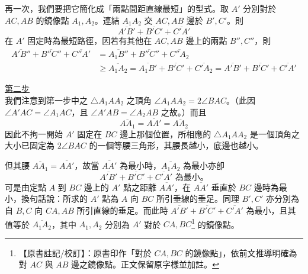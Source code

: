 再一次，我們要把它簡化成「兩點間距直線最短」的型式。取 $A'$ 分別對於 $AC, AB$ 的鏡像點 $A_1, A_2$。連結 $A_1A_2$ 交 $AC, AB$ 邊於 $B', C'$。則
\[ \overline{A'B'} + \overline{B'C'} + \overline{C'A'} \]
在 $A'$ 固定時為最短路徑，因若有其他在 $AC, AB$ 邊上的兩點 $B'', C''$，則
\begin{align*}
\overline{A'B''} + \overline{B''C''} + \overline{C''A'} &= \overline{A_1B''} + \overline{B''C''} + \overline{C''A_2} \\
&\ge \overline{A_1A_2} = \overline{A_1B'} + \overline{B'C'} + \overline{C'A_2} = \overline{A'B'} + \overline{B'C'} + \overline{C'A'}
\end{align*}

\noindent\underline{第二步} \\
我們注意到第一步中之 $\triangle A_1AA_2$ 之頂角 $\angle A_1AA_2 = 2\angle BAC$。（此因 $\angle A'AC = \angle A_1AC$，且 $\angle A'AB = \angle A_2AB$ 之故。）而且
\[ \overline{AA_1} = \overline{AA'} = \overline{AA_2} \]
因此不拘一開始 $A'$ 固定在 $BC$ 邊上那個位置，所相應的 $\triangle A_1AA_2$ 是一個頂角之大小已固定為 $2\angle BAC$ 的一個等腰三角形，其腰長越小，底邊也越小。

但其腰 $\overline{AA_1} = \overline{AA'}$，故當 $\overline{AA'}$ 為最小時，$\overline{A_1A_2}$ 為最小亦卽
\[ \overline{A'B'} + \overline{B'C'} + \overline{C'A'} \text{ 為最小。} \]
可是由定點 $A$ 到 $BC$ 邊上的 $A'$ 點之距離 $\overline{AA'}$，在 $\overline{AA'}$ 垂直於 $BC$ 邊時為最小，換句話說：所求的 $A'$ 點為 $A$ 向 $BC$ 所引垂線的垂足。同理 $B', C'$ 亦分別為自 $B, C$ 向 $CA, AB$ 所引直線的垂足。而此時 $\overline{A'B'} + \overline{B'C'} + \overline{C'A'}$ 為最小，且其值等於 $\overline{A_1A_2}$，其中 $A_1, A_2$ 分別為 $A'$ 對於 $CA, BC$\label{note:b3s-ch5-p255-mirror-line}\footnote{【原書註記/校訂】：原書印作「對於 $CA, BC$ 的鏡像點」，依前文推導明確為對 $AC$ 與 $AB$ 邊之鏡像點。正文保留原字樣並加註。} 的鏡像點。

